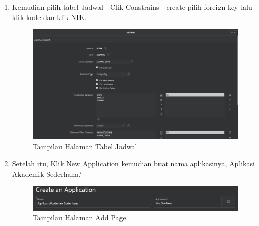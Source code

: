 \begin{enumerate}
\item Kemudian pilih tabel Jadwal - Clik Constrains - create pilih foreign key lalu klik  kode dan klik NIK. 
    \begin{figure}[!htbp]
    \begin{center}
    \includegraphics[scale=0.4]{section/ica7.JPG}
    \caption{Tampilan Halaman Tabel Jadwal}
    \end{center}   
    \end{figure} 
    
\item Setelah itu, Klik New Application kemudian buat nama aplikasinya, Aplikasi Akademik Sederhana.`
    \begin{figure}[!htbp]
    \begin{center}
    \includegraphics[scale=0.5]{section/ica38.JPG}
    \caption{Tampilan Halaman Add Page}
    \end{center}   
    \end{figure} 


\end{enumerate}
